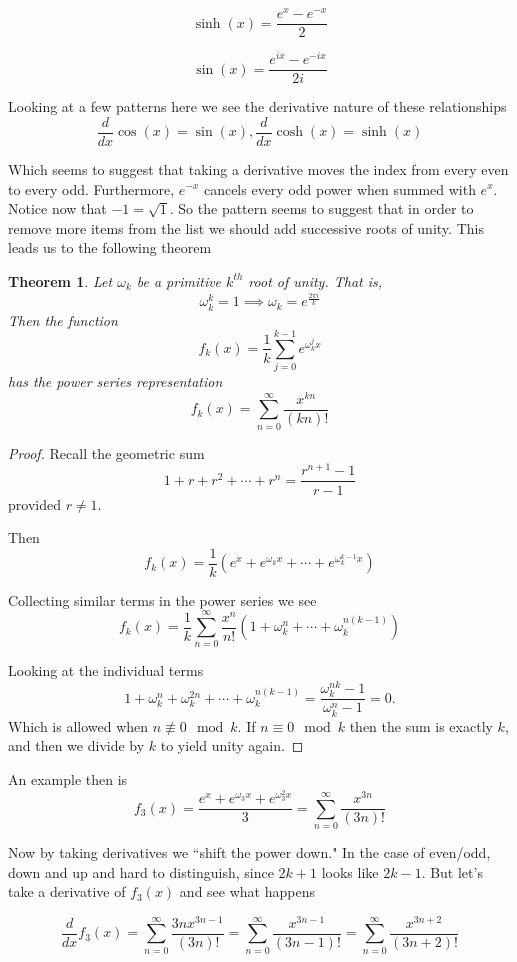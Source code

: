 \documentclass{amsart}
\newtheorem{thm}{Theorem}
\theoremstyle{definition}
\theoremstyle{remark}
\numberwithin{equation}{section}
\begin{document}
\[
\sinh(x) = \frac{e^x - e^{-x}}{2}
\]

\[
\sin(x) = \frac{e^{ix} - e^{-ix}}{2i}
\]

Looking at a few patterns here we see the derivative nature of these relationships
\[
\frac{d}{dx} \cos(x) = \sin(x),  \frac{d}{dx} \cosh(x) = \sinh(x)
\]

Which seems to suggest that taking a derivative moves the index from every even to every odd.  Furthermore, $e^{-x}$ cancels every odd power when summed with $e^x$.  Notice now that $-1 = \sqrt{1}$.  So the pattern seems to suggest that in order to remove more items from the list we should add successive roots of unity.  This leads us to the following theorem

\begin{thm}
Let $\omega_k$ be a primitive $k^{th}$ root of unity.  That is, 
\[
\omega_k^k=1 \implies \omega_k = e^{\frac{2\pi i}{k}}
\]
Then the function
\[
f_k(x) = \frac{1}{k}\sum_{j=0}^{k-1} e^{\omega_k^j x}
\]
has the power series representation
\[
f_k(x) = \sum_{n=0}^{\infty} \frac{x^{kn}}{(kn)!}
\]
\end{thm}


\begin{proof}
Recall the geometric sum
\[
1 + r + r^2 + \cdots + r^n = \frac{r^{n+1}-1}{r-1}
\]
provided $r\ne 1$.

Then
\[
f_k(x) = \frac{1}{k}(e^x + e^{\omega_k x}+ \cdots + e^{\omega_k^{k-1}x})
\]

Collecting similar terms in the power series we see
\[
f_k(x) = \frac{1}{k} \sum_{n=0}^{\infty}\frac{x^n}{n!}(1+\omega_k^n + \cdots + \omega_k^{n(k-1)})
\]

Looking at the individual terms
\[
1+ \omega_k^n + \omega_k^{2n} + \cdots + \omega_k^{n(k-1)} = \frac{\omega_k^{nk}-1}{\omega_k^n -1} = 0.
\]
Which is allowed when $n \not\equiv 0 \mod{k}$.  If $n \equiv 0 \mod{k}$ then the sum is exactly $k$, and then we divide by $k$ to yield unity again.
\end{proof}


An example then is
\[
f_3(x) = \frac{e^x + e^{\omega_3 x}+ e^{\omega_3^2 x}}{3} = \sum_{n=0}^{\infty} \frac{x^{3n}}{(3n)!}
\]


Now by taking derivatives we ``shift the power down."  In  the case of even/odd, down and up and hard to distinguish, since $2k+1$ looks like $2k-1$.  But let's take a derivative of $f_3(x)$ and see what happens

\[
\frac{d}{dx}f_3(x) = \sum_{n=0}^{\infty} \frac{3n x^{3n-1}}{(3n)!} =  \sum_{n=0}^{\infty} \frac{ x^{3n-1}}{(3n-1)!} = \sum_{n=0}^{\infty} \frac{ x^{3n+2}}{(3n+2)!} 
\]
\end{document}
